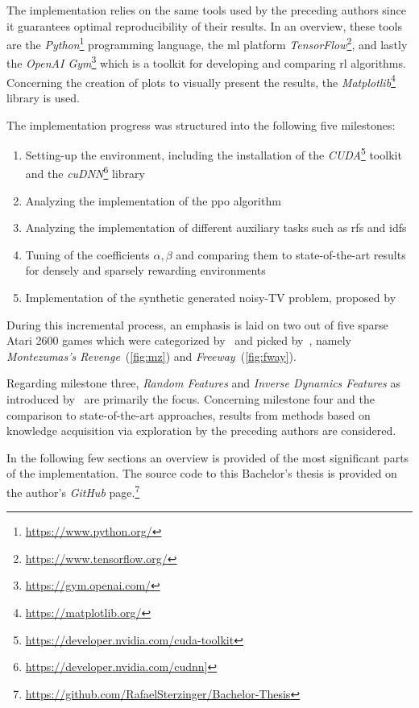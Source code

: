\documentclass[draft,final]{vutinfth} %
\newcommand{\pautoref}[1]{(\autoref{#1})}
\begin{document}
    The implementation relies on the same tools used by the preceding authors since it guarantees optimal reproducibility of their results.
    In an overview, these tools are the \textit{Python}\footnote{\url{https://www.python.org/}} programming language, the \gls{ml} platform \textit{TensorFlow}\footnote{\url{https://www.tensorflow.org/}}, and lastly the \textit{OpenAI Gym}\footnote{\url{https://gym.openai.com/}} which is a toolkit for developing and comparing \gls{rl} algorithms.
    Concerning the creation of plots to visually present the results, the \textit{Matplotlib}\footnote{\url{https://matplotlib.org/}} library is used.

    The implementation progress was structured into the following five milestones:

    \begin{enumerate}
        \item Setting-up the environment, including the installation of the \textit{CUDA}\footnote{\url{https://developer.nvidia.com/cuda-toolkit}} toolkit and the \textit{cuDNN}\footnote{\url{https://developer.nvidia.com/cudnn}]} library
        \item Analyzing the implementation of the \gls{ppo} algorithm
        \item Analyzing the implementation of different auxiliary tasks such as \glspl{rf} and \glspl{idf}
        \item Tuning of the coefficients $\alpha,\beta$ and comparing them to state-of-the-art results for densely and sparsely rewarding environments
        \item Implementation of the synthetic generated noisy-TV problem, proposed by~\cite{burda_large-scale_2018-1}
    \end{enumerate}

    During this incremental process, an emphasis is laid on two out of five sparse Atari 2600 games which were categorized by~\cite{bellemare_unifying_2016} and picked by~\citet{burda_large-scale_2018-1}, namely \textit{Montezumas's Revenge}~\pautoref{fig:mz} and \textit{Freeway}~\pautoref{fig:fway}.

    Regarding milestone three, \textit{Random Features} and \textit{Inverse Dynamics Features} as introduced by~\citet{burda_large-scale_2018-1} are primarily the focus.
    Concerning milestone four and the comparison to state-of-the-art approaches, results from methods based on knowledge acquisition via exploration by the preceding authors are considered.

    In the following few sections an overview is provided of the most significant parts of the implementation.
    The source code to this Bachelor's thesis is provided on the author's \textit{GitHub} page.\footnote{\url{https://github.com/RafaelSterzinger/Bachelor-Thesis}}
\end{document}
